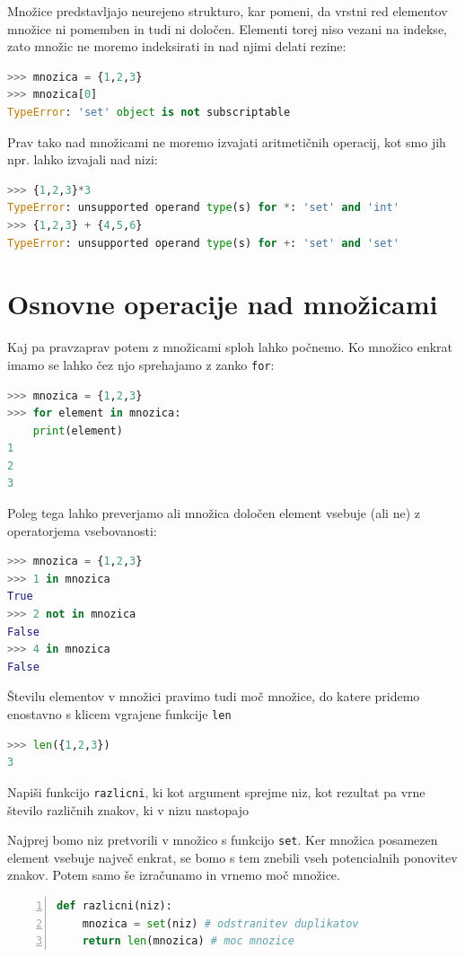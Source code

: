 Množice predstavljajo neurejeno strukturo, kar pomeni, da vrstni red elementov množice ni pomemben in tudi ni določen. Elementi torej niso vezani na indekse, zato množic ne moremo indeksirati in nad njimi delati rezine:
\begin{lstlisting}[language=Python]
>>> mnozica = {1,2,3}
>>> mnozica[0]
TypeError: 'set' object is not subscriptable
\end{lstlisting}
Prav tako nad množicami ne moremo izvajati aritmetičnih operacij, kot smo jih npr. lahko izvajali nad nizi:
\begin{lstlisting}[language=Python]
>>> {1,2,3}*3
TypeError: unsupported operand type(s) for *: 'set' and 'int'
>>> {1,2,3} + {4,5,6}
TypeError: unsupported operand type(s) for +: 'set' and 'set'
\end{lstlisting}

\section{Osnovne operacije nad množicami}

Kaj pa pravzaprav potem z množicami sploh lahko počnemo. Ko množico enkrat imamo se lahko čez njo sprehajamo z zanko \texttt{for}:
\begin{lstlisting}[language=Python]
>>> mnozica = {1,2,3}
>>> for element in mnozica:
	print(element)
1
2
3
\end{lstlisting} 
Poleg tega lahko preverjamo ali množica določen element vsebuje (ali ne) z operatorjema vsebovanosti:
\begin{lstlisting}[language=Python]
>>> mnozica = {1,2,3}
>>> 1 in mnozica
True
>>> 2 not in mnozica
False
>>> 4 in mnozica
False
\end{lstlisting}

Številu elementov v množici pravimo tudi moč množice, do katere pridemo enostavno s klicem vgrajene funkcije \texttt{len}
\begin{lstlisting}[language=Python]
>>> len({1,2,3})
3
\end{lstlisting}

\begin{zgled}
Napiši funkcijo \texttt{razlicni}, ki kot argument sprejme niz, kot rezultat pa vrne število različnih znakov, ki v nizu nastopajo
\end{zgled}
\begin{resitev}
Najprej bomo niz pretvorili v množico s funkcijo \texttt{set}. Ker množica posamezen element vsebuje največ enkrat, se bomo s tem znebili vseh potencialnih ponovitev znakov. Potem samo še izračunamo in vrnemo moč množice.
\begin{lstlisting}[language=Python,numbers=left]
def razlicni(niz):
    mnozica = set(niz) # odstranitev duplikatov
    return len(mnozica) # moc mnozice
\end{lstlisting}
\end{resitev}


